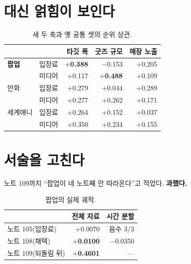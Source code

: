 \documentclass[10pt]{article}
\begin{document}
\section{대신 얽힘이 보인다}

\begin{table}[t]
\centering\tsize
\caption{새 두 축과 옛 공통 셋의 순위 상관.}
\begin{tabular}{llrrr}
\toprule
& & 타깃 폭 & 굿즈 규모 & 매장 노출 \\
\midrule
\textbf{팝업} & 입장료 & \textbf{$+$0.388} & $-$0.153 & $+$0.205 \\
& 미디어 & $+$0.117 & \textbf{$+$0.488} & $+$0.109 \\
\midrule
만화 & 입장료 & $+$0.279 & $+$0.044 & $+$0.289 \\
& 미디어 & $+$0.277 & $+$0.262 & $+$0.171 \\
세계애니 & 입장료 & $+$0.264 & $+$0.152 & $+$0.037 \\
& 미디어 & $+$0.350 & $+$0.234 & $+$0.155 \\
\bottomrule
\end{tabular}
\end{table}


\section{서술을 고친다}

노트 109까지 ``팝업이 네 노트째 안 따라온다''고 적었다. \textbf{과했다.}

\begin{table}[t]
\centering\tsize
\caption{팝업의 실제 궤적.}
\begin{tabular}{lrr}
\toprule
& 전체 자료 & 시간 분할 \\
\midrule
노트 105(입장료) & $+$0.0070 & 음수 3/3 \\
노트 108(채택) & \textbf{$+$0.0100} & $-$0.0350 \\
노트 109(되돌림 뒤) & \textbf{$+$0.4601} & --- \\
\bottomrule
\end{tabular}
\end{table}
\end{document}
